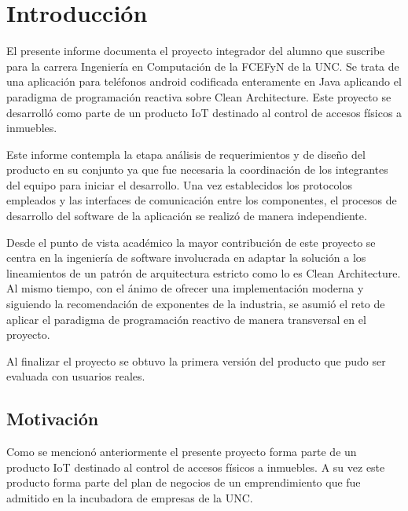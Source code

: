 
\chapter{Introducción} %

\label{Chapter1} %


El presente informe documenta el proyecto integrador del alumno que suscribe para la carrera Ingeniería en Computación de la FCEFyN de la UNC. Se trata de una aplicación para teléfonos android codificada enteramente en Java aplicando el paradigma de programación reactiva sobre Clean Architecture. Este proyecto se desarrolló como parte de un producto IoT destinado al control de accesos físicos a inmuebles.

Este informe contempla la etapa análisis de requerimientos y de diseño del producto en su conjunto ya que fue necesaria la coordinación de los integrantes del equipo para iniciar el desarrollo. Una vez establecidos los protocolos empleados y las interfaces de comunicación entre los componentes, el procesos de desarrollo del software de la aplicación se realizó de manera independiente.

Desde el punto de vista académico la mayor contribución de este proyecto se centra en la ingeniería de software involucrada en adaptar la solución a los lineamientos de un patrón de arquitectura estricto como lo es Clean Architecture. Al mismo tiempo, con el ánimo de ofrecer una implementación moderna y siguiendo la recomendación de exponentes de la industria, se asumió el reto de aplicar el paradigma de programación reactivo de manera transversal en el proyecto.

Al finalizar el proyecto se obtuvo la primera versión del producto que pudo ser evaluada con usuarios reales.

\section{Motivación}
Como se mencionó anteriormente el presente proyecto forma parte de un producto IoT destinado al control de accesos físicos a inmuebles.
A su vez este producto forma parte del plan de negocios de un emprendimiento que fue admitido en la incubadora de empresas de la UNC.


